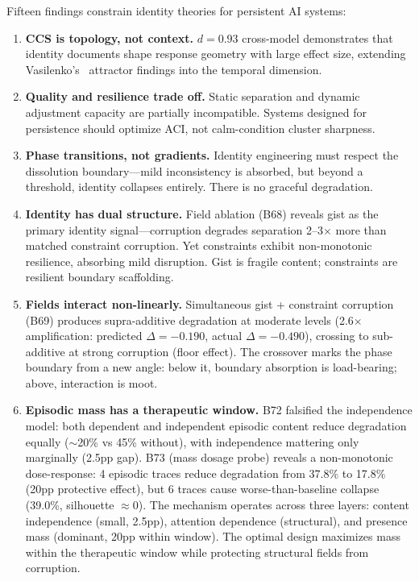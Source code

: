 \documentclass[11pt,a4paper]{article}
\begin{document}
Fifteen findings constrain identity theories for persistent AI systems:

\begin{enumerate}
\item \textbf{CCS is topology, not context.} $d = 0.93$ cross-model demonstrates that
identity documents shape response geometry with large effect size, extending
Vasilenko's~\cite{vasilenko2026} attractor findings into the temporal dimension.

\item \textbf{Quality and resilience trade off.} Static separation and dynamic
adjustment capacity are partially incompatible. Systems designed for persistence
should optimize ACI, not calm-condition cluster sharpness.

\item \textbf{Phase transitions, not gradients.} Identity engineering must respect
the dissolution boundary---mild inconsistency is absorbed, but beyond a threshold,
identity collapses entirely. There is no graceful degradation.

\item \textbf{Identity has dual structure.} Field ablation (B68) reveals gist as the
primary identity signal---corruption degrades separation 2--3$\times$ more than matched
constraint corruption. Yet constraints exhibit non-monotonic resilience, absorbing mild
disruption. Gist is fragile content; constraints are resilient boundary scaffolding.

\item \textbf{Fields interact non-linearly.} Simultaneous gist + constraint corruption
(B69) produces supra-additive degradation at moderate levels (2.6$\times$ amplification:
predicted $\Delta = -0.190$, actual $\Delta = -0.490$), crossing to sub-additive at
strong corruption (floor effect). The crossover marks the phase boundary from a new
angle: below it, boundary absorption is load-bearing; above, interaction is moot.

\item \textbf{Episodic mass has a therapeutic window.}
B72 falsified the independence model: both dependent and independent episodic
content reduce degradation equally ($\sim$20\% vs 45\% without), with independence
mattering only marginally (2.5pp gap). B73 (mass dosage probe) reveals a
non-monotonic dose-response: 4 episodic traces reduce degradation from 37.8\% to
17.8\% (20pp protective effect), but 6 traces cause worse-than-baseline collapse
(39.0\%, silhouette $\approx 0$). The mechanism operates across three layers:
content independence (small, 2.5pp), attention dependence (structural), and
presence mass (dominant, 20pp within window). The optimal design maximizes mass
within the therapeutic window while protecting structural fields from corruption.


\end{enumerate}
\end{document}
